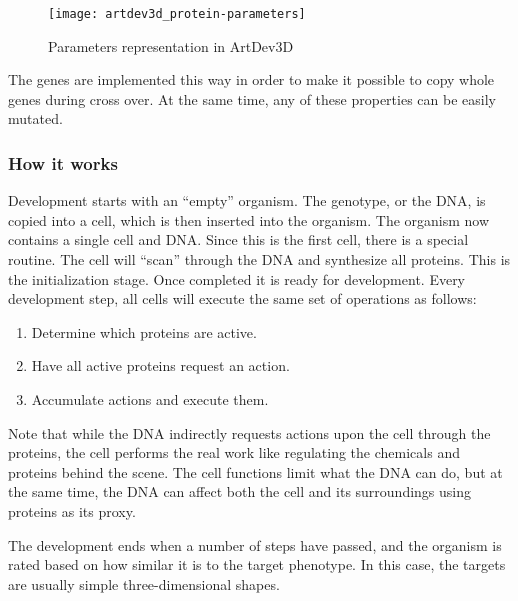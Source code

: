 \begin{figure}[!ht]
	\centering
	\texttt{[image: artdev3d\_protein-parameters]}
	\caption{Parameters representation in ArtDev3D}
	\label{fig:artdev3d_protein-parameters}
\end{figure}

The genes are implemented this way in order to make it possible to copy whole genes during cross over. At the same time, any of these properties can be easily mutated.

\subsubsection{How it works}
Development starts with an ``empty'' organism. The genotype, or the DNA, is copied into a cell, which is then inserted into the organism. The organism now contains a single cell and DNA. Since this is the first cell, there is a special routine. The cell will ``scan'' through the DNA and synthesize all proteins. This is the initialization stage. Once completed it is ready for development. Every development step, all cells will execute the same set of operations as follows:

\begin{enumerate}
	\itemsep=0pt
	\item Determine which proteins are active.
	\item Have all active proteins request an action.
	\item Accumulate actions and execute them.
\end{enumerate}

Note that while the DNA indirectly requests actions upon the cell through the proteins, the cell performs the real work like regulating the chemicals and proteins behind the scene. The cell functions limit what the DNA can do, but at the same time, the DNA can affect both the cell and its surroundings using proteins as its proxy.

The development ends when a number of steps have passed, and the organism is rated based on how similar it is to the target phenotype. In this case, the targets are usually simple three-dimensional shapes.

